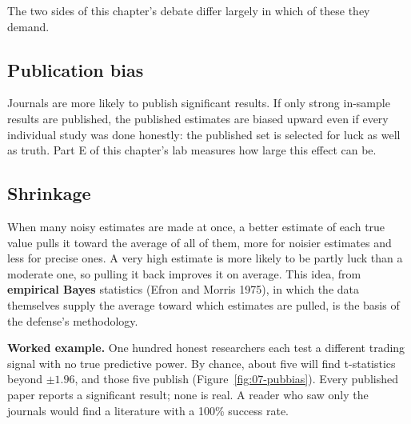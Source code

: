 The two sides of this chapter's debate differ largely in which of these they demand.

\subsection{Publication bias}

Journals are more likely to publish significant results. If only strong in-sample results are published, the published estimates are biased upward even if every individual study was done honestly: the published set is selected for luck as well as truth. Part E of this chapter's lab measures how large this effect can be.

\subsection{Shrinkage}

When many noisy estimates are made at once, a better estimate of each true value pulls it toward the average of all of them, more for noisier estimates and less for precise ones. A very high estimate is more likely to be partly luck than a moderate one, so pulling it back improves it on average. This idea, from \textbf{empirical Bayes} statistics (Efron and Morris 1975), in which the data themselves supply the average toward which estimates are pulled, is the basis of the defense's methodology.

\textbf{Worked example.} One hundred honest researchers each test a different trading signal with no true predictive power. By chance, about five will find t-statistics beyond $\pm 1.96$, and those five publish (Figure~\ref{fig:07-pubbias}). Every published paper reports a significant result; none is real. A reader who saw only the journals would find a literature with a 100\% success rate.

